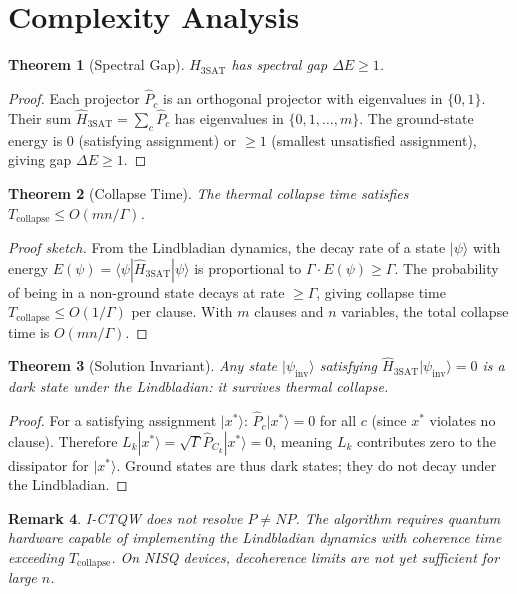 \documentclass[12pt]{article}
\newtheorem{theorem}{Theorem}[section]
\newtheorem{remark}[theorem]{Remark}
\begin{document}
\section{Complexity Analysis}

\begin{theorem}[Spectral Gap]
\label{thm:gap}
$\hat{H}_{3\mathrm{SAT}}$ has spectral gap $\Delta E \geq 1$.
\end{theorem}
\begin{proof}
Each projector $\hat{P}_c$ is an orthogonal projector with eigenvalues in $\{0, 1\}$. Their
sum $\hat{H}_{3\mathrm{SAT}} = \sum_c \hat{P}_c$ has eigenvalues in $\{0, 1, \ldots, m\}$.
The ground-state energy is $0$ (satisfying assignment) or $\geq 1$ (smallest unsatisfied
assignment), giving gap $\Delta E \geq 1$.
\end{proof}

\begin{theorem}[Collapse Time]
\label{thm:collapse}
The thermal collapse time satisfies $T_{\mathrm{collapse}} \leq O(mn/\Gamma)$.
\end{theorem}
\begin{proof}[Proof sketch]
From the Lindbladian dynamics, the decay rate of a state $|\psi\rangle$ with energy
$E(\psi) = \langle\psi|\hat{H}_{3\mathrm{SAT}}|\psi\rangle$ is proportional to
$\Gamma \cdot E(\psi) \geq \Gamma$. The probability of being in a non-ground state decays
at rate $\geq \Gamma$, giving collapse time $T_{\mathrm{collapse}} \leq O(1/\Gamma)$ per
clause. With $m$ clauses and $n$ variables, the total collapse time is $O(mn/\Gamma)$.
\end{proof}

\begin{theorem}[Solution Invariant]
\label{thm:inv}
Any state $|\psi_{\mathrm{inv}}\rangle$ satisfying $\hat{H}_{3\mathrm{SAT}}|\psi_{\mathrm{inv}}\rangle = 0$
is a dark state under the Lindbladian: it survives thermal collapse.
\end{theorem}
\begin{proof}
For a satisfying assignment $|x^*\rangle$: $\hat{P}_c|x^*\rangle = 0$ for all $c$ (since
$x^*$ violates no clause). Therefore $L_k|x^*\rangle = \sqrt{\Gamma}\hat{P}_{C_k}|x^*\rangle = 0$,
meaning $L_k$ contributes zero to the dissipator for $|x^*\rangle$. Ground states are thus
dark states; they do not decay under the Lindbladian.
\end{proof}

\begin{remark}
I-CTQW does not resolve $P \neq NP$. The algorithm requires quantum hardware
capable of implementing the Lindbladian dynamics with coherence time exceeding
$T_{\mathrm{collapse}}$. On NISQ devices, decoherence limits are not yet sufficient for
large $n$.
\end{remark}
\end{document}
